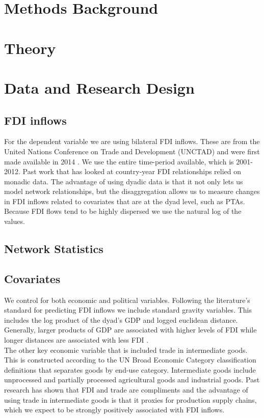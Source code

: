 \documentclass{article}
\begin{document}
\section{Methods Background}

\section{Theory}

\section{Data and Research Design}

\subsection{FDI inflows}

For the dependent variable we are using bilateral FDI inflows. These are from the United Nations Conference on Trade and Development (UNCTAD) and were first made available in 2014 \cite{UNCTAD}. We use the entire time-period available, which is 2001-2012. Past work that has looked at country-year FDI relationships relied on monadic data. The advantage of using dyadic data is that it not only lets us model network relationships, but the disaggregation allows us to measure changes in FDI inflows related to covariates that are at the dyad level, such as PTAs. Because FDI flows tend to be highly dispersed we use the natural log of the values. 

\subsection{Network Statistics}

\subsection{Covariates}

We control for both economic and political variables. Following the literature's standard for predicting FDI inflows we include standard gravity variables. This includes the log product of the dyad's GDP and logged euclidean distance. Generally, larger products of GDP are associated with higher levels of FDI while longer distances are associated with less FDI \cite{MZ2011, WB1}. \\

The other key economic variable that is included trade in intermediate goods\cite{OECD}. This is constructed according to the UN Broad Economic Category classification definitions that separates goods by end-use category. Intermediate goods include unprocessed and partially processed agricultural goods and industrial goods. Past research has shown that FDI and trade are compliments \cite{aizenman2006fdi} and the advantage of using trade in intermediate goods is that it proxies for production supply chains, which we expect to be strongly positively associated with FDI inflows.\\
\end{document}
